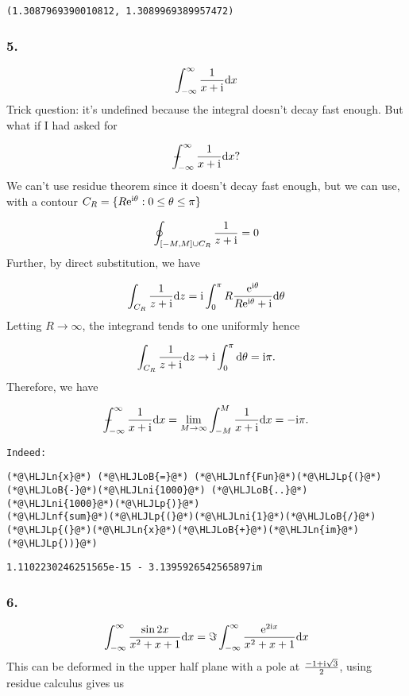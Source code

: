 \documentclass[12pt,landscape]{article}
\newcommand{\HLJLn}[1]{#1}
\newcommand{\HLJLnf}[1]{\textcolor[RGB]{66,102,213}{#1}}
\newcommand{\HLJLni}[1]{\textcolor[RGB]{59,151,46}{#1}}
\newcommand{\HLJLoB}[1]{\textcolor[RGB]{102,102,102}{\textbf{#1}}}
\newcommand{\HLJLp}[1]{#1}
\def\D{ {\rm d} }
\def\I{ {\rm i} }
\def\E{ {\rm e} }
\def\Xint#1{ \mathchoice
   {\XXint\displaystyle\textstyle{#1} }%
   {\XXint\textstyle\scriptstyle{#1} }%
   {\XXint\scriptstyle\scriptscriptstyle{#1} }%
   {\XXint\scriptscriptstyle\scriptscriptstyle{#1} }%
   \!\int}
\def\XXint#1#2#3{ {\setbox0=\hbox{$#1{#2#3}{\int}$}
     \vcenter{\hbox{$#2#3$}}\kern-.5\wd0} }
\def\dashint{\Xint-}
\def\dx{\D x}
\def\dz{\D z}
\begin{document}
{\begin{lstlisting}
(1.3087969390010812, 1.3089969389957472)
\end{lstlisting}


\subsubsection{5.}
\[
	\int_{-\infty}^\infty    {1 \over x + \I } \dx
\]
Trick question: it's undefined because the integral doesn't decay fast enough. But what if I had asked for

\[
	\dashint_{-\infty}^\infty    {1 \over x + \I } \dx?
\]
We can't use residue theorem since it doesn't decay fast enough, but we can use, with a contour $C_R = \{ R \E^{\I \theta} : 0 \leq \theta \leq \pi \}$

\[
\oint_{[-M, M] \cup C_R} {1 \over z + \I}   = 0
\]
Further, by direct substitution, we have

\[
\int_{C_R} {1 \over z + \I}\dz = \I \int_0^\pi  R {\E^{\I \theta} \over R \E^{\I \theta} + \I} \D \theta
\]
Letting $R \rightarrow \infty$, the integrand tends to one uniformly hence

\[
 \int_{C_R} {1 \over z + \I}\dz  \rightarrow \I \int_0^\pi  \D \theta  = \I \pi.
\]
Therefore, we have

\[
	\dashint_{-\infty}^\infty    {1 \over x + \I } \dx = \lim_{M\rightarrow \infty} \int_{-M}^M {1 \over x + \I}  \dx =  - \I \pi .
\]
\begin{verbatim}
Indeed:
\end{verbatim}

\begin{lstlisting}
(*@\HLJLn{x}@*) (*@\HLJLoB{=}@*) (*@\HLJLnf{Fun}@*)(*@\HLJLp{(}@*)(*@\HLJLoB{-}@*)(*@\HLJLni{1000}@*) (*@\HLJLoB{..}@*) (*@\HLJLni{1000}@*)(*@\HLJLp{)}@*)
(*@\HLJLnf{sum}@*)(*@\HLJLp{(}@*)(*@\HLJLni{1}@*)(*@\HLJLoB{/}@*)(*@\HLJLp{(}@*)(*@\HLJLn{x}@*)(*@\HLJLoB{+}@*)(*@\HLJLn{im}@*)(*@\HLJLp{))}@*)
\end{lstlisting}

\begin{lstlisting}
1.1102230246251565e-15 - 3.1395926542565897im
\end{lstlisting}


\subsubsection{6.}
\[
\int_{-\infty}^\infty    {\sin 2x \over x^2 + x + 1} \dx = \Im \int_{-\infty}^\infty    {\E^{ 2 \I x} \over x^2 + x + 1} \dx
\]
This can be deformed in the upper half plane with a pole at ${-1 + \I \sqrt{3} \over 2}$, using residue calculus gives us

}
\end{document}
